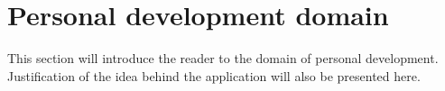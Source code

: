
\chapter{Personal development domain}\label{ch:personal-development-domain}

This section will introduce the reader to the domain of personal development.
Justification of the idea behind the application will also be presented here.




